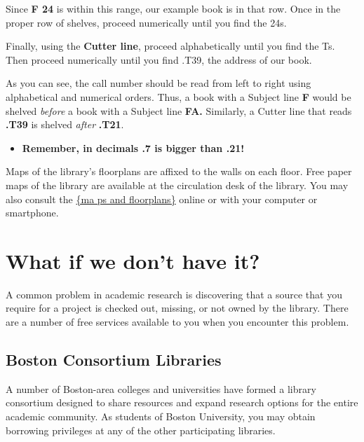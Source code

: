 {\begin{center}
\hspace{.4in}{\huge F 7.4\textendash F 45.2}
\end{center}

Since \textbf{F 24} is within this range, our example book is in that row. Once 
in the proper row of shelves, proceed numerically until you find the 24s. 

Finally, using the \textbf{Cutter line}, proceed alphabetically until you find 
the Ts. Then proceed numerically until you find .T39, the address of our book. 

As you can see, the call number should be read from left to right using 
alphabetical and numerical orders. Thus, a book with a Subject line \textbf{F 
}would be shelved \emph{before} a book with a Subject line \textbf{FA.} 
Similarly, a Cutter line that reads \textbf{.T39} is shelved \emph{after} 
\textbf{.T21}. 

\begin{itemize}
\item \textbf{Remember, in decimals .7 is bigger than .21!}
\end{itemize}

Maps of the library's floorplans are affixed to the walls on each floor. Free 
paper maps of the library are available at the circulation desk of the library. 
You may also consult the 
\href{http://www.bu.edu/library/mugar-memorial/about/floorplans/#f=floor-1}{\{ma
ps and floorplans\}} online or with your computer or smartphone. 

\section{What if we don't have it?}
    
A common problem in academic research is discovering that a source that you 
require for a project is checked out, missing, or not owned by the library. 
There are a number of free services available to you when you encounter this 
problem.

\subsection{Boston Consortium Libraries}

A number of Boston-area colleges and universities have formed a library 
consortium designed to share resources and expand research options for the 
entire academic community. As students of Boston University, you may obtain 
borrowing privileges at any of the other participating libraries. 

}
